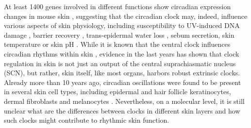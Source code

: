 At least 1400 genes involved in different functions show circadian expression changes in mouse skin \cite{Plikus2015}, suggesting that the circadian clock may, indeed, influence various aspects of skin physiology, including susceptibility to UV-induced DNA damage \cite{Geyfman2012, Wang2017}, barrier recovery \cite{Yosipovitch2004}, trans-epidermal water loss \cite{Yosipovitch1998}, sebum secretion, skin temperature or skin pH \cite{LeFur2001}. While it is known that the central clock influences circadian rhythms within skin \cite{Tanioka2009}, evidence in the last years has shown that clock regulation in skin is not just an output of the central suprachiasmatic nucleus (SCN), but rather, skin itself, like most organs, harbors robust extrinsic clocks. Already more than 10 years ago, circadian oscillations were found to be present in several skin cell types, including epidermal and hair follicle keratinocytes, dermal fibroblasts and melanocytes \cite{Zanello2000, Bjarnason2001, Kawara2002, Oishi2002, Brown2005, Brown2008, Spoerl2011}. Nevertheless, on a molecular level, it is still unclear what are the differences between clocks in different skin layers and how such clocks might contribute to rhythmic skin function. \\ %


